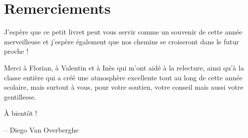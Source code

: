 \documentclass{coursbook}
\begin{document}
	\chapter{Remerciements}
	J'espère que ce petit livret peut vous servir comme un souvenir de cette année merveilleuse et j'espère également que nos chemins se croiseront dans le futur proche !
	
	Merci à Florian, à Valentin et à Inès qui m'ont aidé à la relecture, ainsi qu'à la classe entière qui a créé une atmosphère excellente tout au long de cette année scolaire, mais surtout à vous, pour votre soutien, votre conseil mais aussi votre gentillesse.

	À bientôt !

    -- Diego Van Overberghe
\end{document}
